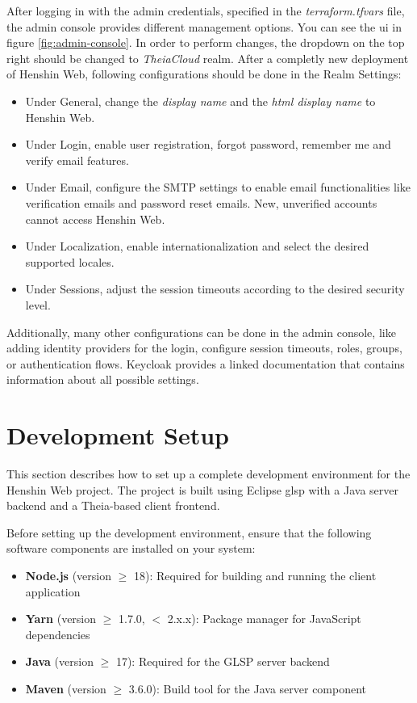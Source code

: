 After logging in with the admin credentials, specified in the \textit{terraform.tfvars} file, the admin console provides different management options. You can see the \acs{ui} in figure \ref{fig:admin-console}. In order to perform changes, the dropdown on the top right should be changed to \textit{TheiaCloud} realm. After a completly new deployment of Henshin Web, following configurations should be done in the Realm Settings:
\begin{itemize}
  \item Under General, change the \textit{display name} and the \textit{\ac{html} display name} to Henshin Web.
  \item Under Login, enable user registration, forgot password, remember me and verify email features.
  \item Under Email, configure the SMTP settings to enable email functionalities like verification emails and password reset emails. New, unverified accounts cannot access Henshin Web.
  \item Under Localization, enable internationalization and select the desired supported locales.
  \item Under Sessions, adjust the session timeouts according to the desired security level.
\end{itemize}

Additionally, many other configurations can be done in the admin console, like adding identity providers for the login, configure session timeouts, roles, groups, or authentication flows. Keycloak provides a linked documentation that contains information about all possible settings.

\section{Development Setup}
\label{sec:dev-setup}

This section describes how to set up a complete development environment for the Henshin Web project. The project is built using Eclipse \ac{glsp} with a Java server backend and a Theia-based client frontend.

Before setting up the development environment, ensure that the following software components are installed on your system:

\begin{itemize}
    \item \textbf{Node.js} (version $\geq$ 18): Required for building and running the client application
    \item \textbf{Yarn} (version $\geq$ 1.7.0, $<$ 2.x.x): Package manager for JavaScript dependencies
    \item \textbf{Java} (version $\geq$ 17): Required for the GLSP server backend
    \item \textbf{Maven} (version $\geq$ 3.6.0): Build tool for the Java server component
\end{itemize}

